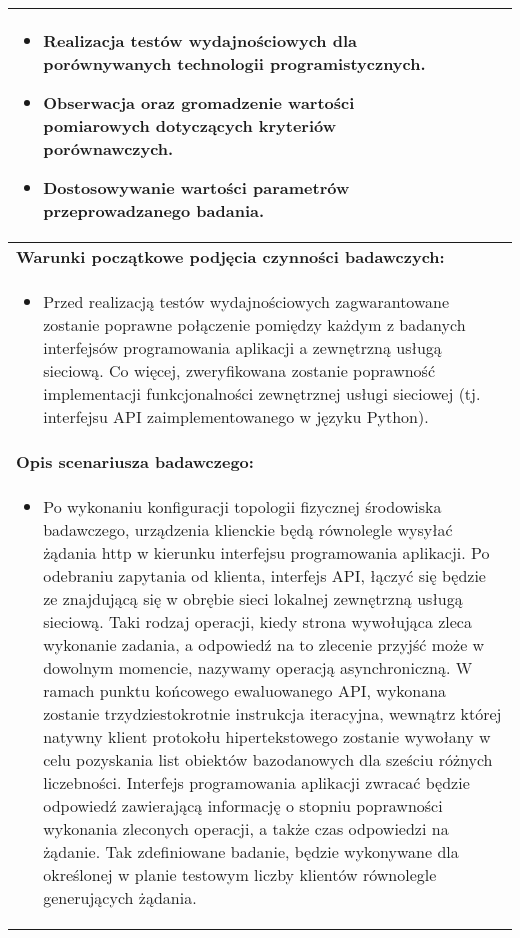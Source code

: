 \begin{longtable}[c]{|llll|}
{        \begin{itemize}
            \item Realizacja testów wydajnościowych dla porównywanych technologii programistycznych.
            \item Obserwacja oraz gromadzenie wartości pomiarowych dotyczących kryteriów porównawczych.
            \item Dostosowywanie wartości parametrów przeprowadzanego badania.
        \end{itemize}
    }                                                           \\ \hline
    \multicolumn{4}{|l|}{\textbf{Warunki początkowe podjęcia czynności badawczych:}} \\ \hline
    \multicolumn{4}{|p{\linewidth}|}{
        \begin{itemize}[label={}]
            \item Przed realizacją testów wydajnościowych zagwarantowane zostanie poprawne połączenie pomiędzy każdym z badanych interfejsów programowania aplikacji a zewnętrzną usługą sieciową. Co więcej, zweryfikowana zostanie poprawność implementacji funkcjonalności zewnętrznej usługi sieciowej (tj. interfejsu API zaimplementowanego w języku Python).
          \end{itemize}
    }                                                           \\ \hline
    \multicolumn{4}{|l|}{\textbf{Opis scenariusza badawczego:}}                      \\ \hline
    \multicolumn{4}{|p{\linewidth}|}{
        \begin{itemize}[label={}]
            \item Po wykonaniu konfiguracji topologii fizycznej środowiska badawczego, urządzenia klienckie będą równolegle wysyłać żądania http w kierunku interfejsu programowania aplikacji. Po odebraniu zapytania od klienta, interfejs API, łączyć się będzie ze znajdującą się w obrębie sieci lokalnej zewnętrzną usługą sieciową. Taki rodzaj operacji, kiedy strona wywołująca zleca wykonanie zadania, a odpowiedź na to zlecenie przyjść może w dowolnym momencie, nazywamy operacją asynchroniczną. W ramach punktu końcowego ewaluowanego API, wykonana zostanie trzydziestokrotnie instrukcja iteracyjna, wewnątrz której natywny klient protokołu hipertekstowego zostanie wywołany w celu pozyskania list obiektów bazodanowych dla sześciu różnych liczebności. Interfejs programowania aplikacji zwracać będzie odpowiedź zawierającą informację o stopniu poprawności wykonania zleconych operacji, a także czas odpowiedzi na żądanie. Tak zdefiniowane badanie, będzie wykonywane dla określonej w planie testowym liczby klientów równolegle generujących żądania.

\end{itemize}}
\end{longtable}
